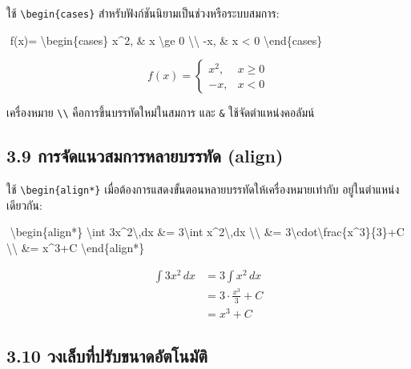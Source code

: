 \documentclass[
  thai,
  12pt,
  letterpaper,
  DIV=11,
  numbers=noendperiod]{scrartcl}
\newenvironment{Shaded}{\begin{snugshade}}{\end{snugshade}}
\newcommand{\NormalTok}[1]{\textcolor[rgb]{0.00,0.23,0.31}{#1}}
\newcommand{\SpecialCharTok}[1]{\textcolor[rgb]{0.37,0.37,0.37}{#1}}
\begin{document}
ใช้ \texttt{\textbackslash{}begin\{cases\}}
สำหรับฟังก์ชันนิยามเป็นช่วงหรือระบบสมการ:

\begin{Shaded}
\begin{Highlighting}[]
\NormalTok{$$}
\NormalTok{f(x)=}
\NormalTok{\textbackslash{}begin\{cases\}}
\NormalTok{x\^{}2, \& x \textbackslash{}ge 0 }\SpecialCharTok{\textbackslash{}\textbackslash{}}
\NormalTok{{-}x, \& x \textless{} 0}
\NormalTok{\textbackslash{}end\{cases\}}
\NormalTok{$$}
\end{Highlighting}
\end{Shaded}

\[
f(x)=
\begin{cases}
x^2, & x \ge 0 \\
-x, & x < 0
\end{cases}
\]

เครื่องหมาย \texttt{\textbackslash{}\textbackslash{}}
คือการขึ้นบรรทัดใหม่ในสมการ และ \texttt{\&} ใช้จัดตำแหน่งคอลัมน์

\subsection{3.9 การจัดแนวสมการหลายบรรทัด
(align)}\label{uxe01uxe32uxe23uxe08uxe14uxe41uxe19uxe27uxe2auxe21uxe01uxe32uxe23uxe2buxe25uxe32uxe22uxe1auxe23uxe23uxe17uxe14-align}

ใช้ \texttt{\textbackslash{}begin\{align*\}}
เมื่อต้องการแสดงขั้นตอนหลายบรรทัดให้เครื่องหมายเท่ากับ อยู่ในตำแหน่งเดียวกัน:

\begin{Shaded}
\begin{Highlighting}[]
\NormalTok{$$}
\NormalTok{\textbackslash{}begin\{align*\}}
\NormalTok{\textbackslash{}int 3x\^{}2\textbackslash{},dx \&= 3\textbackslash{}int x\^{}2\textbackslash{},dx }\SpecialCharTok{\textbackslash{}\textbackslash{}}
\NormalTok{\&= 3\textbackslash{}cdot\textbackslash{}frac\{x\^{}3\}\{3\}+C }\SpecialCharTok{\textbackslash{}\textbackslash{}}
\NormalTok{\&= x\^{}3+C}
\NormalTok{\textbackslash{}end\{align*\}}
\NormalTok{$$}
\end{Highlighting}
\end{Shaded}

\begin{align*}
\int 3x^2\,dx &= 3\int x^2\,dx \\
&= 3\cdot\frac{x^3}{3}+C \\
&= x^3+C
\end{align*}

\subsection{3.10
วงเล็บที่ปรับขนาดอัตโนมัติ}\label{uxe27uxe07uxe40uxe25uxe1auxe17uxe1buxe23uxe1auxe02uxe19uxe32uxe14uxe2duxe15uxe42uxe19uxe21uxe15}
\end{document}
